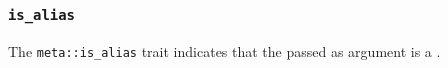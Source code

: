 
\subsubsection{\texttt{is\_alias}}

The \texttt{meta::is\_alias}
trait indicates that the  passed as argument is a .


